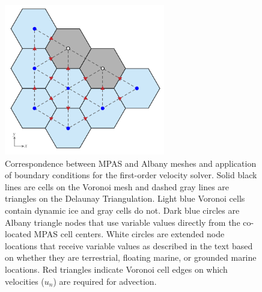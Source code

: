 

\begin{figure}[t]
\includegraphics[width=7.0cm]{landice/figures/mpas_grid_albany_bc.pdf}
\caption{Correspondence between MPAS and Albany meshes and application of boundary conditions for the first-order velocity solver.
Solid black lines are cells on the Voronoi mesh and dashed gray lines are triangles on the Delaunay Triangulation.
Light blue Voronoi cells contain dynamic ice and gray cells do not.  
Dark blue circles are Albany triangle nodes that use variable values directly from the co-located MPAS cell centers.
White circles are extended node locations that receive variable values as described in the text based on whether they are terrestrial, floating marine, or grounded marine locations.
Red triangles indicate Voronoi cell edges on which velocities ($u_n$) are required for advection.
}
\label{fig:mesh-bc}
\end{figure}


